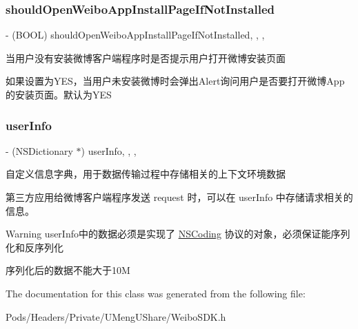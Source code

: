 \subsubsection{\texorpdfstring{should\+Open\+Weibo\+App\+Install\+Page\+If\+Not\+Installed}{shouldOpenWeiboAppInstallPageIfNotInstalled}}
{\footnotesize\ttfamily -\/ (B\+O\+OL) should\+Open\+Weibo\+App\+Install\+Page\+If\+Not\+Installed\hspace{0.3cm}{\ttfamily [read]}, {\ttfamily [write]}, {\ttfamily [nonatomic]}, {\ttfamily [assign]}}

当用户没有安装微博客户端程序时是否提示用户打开微博安装页面

如果设置为\+Y\+E\+S，当用户未安装微博时会弹出\+Alert询问用户是否要打开微博\+App的安装页面。默认为\+Y\+ES \mbox{\label{interface_w_b_data_transfer_object_ab9b7bf91e1470d29782202c04d1a86fe}} 
\subsubsection{\texorpdfstring{user\+Info}{userInfo}}
{\footnotesize\ttfamily -\/ (N\+S\+Dictionary $\ast$) user\+Info\hspace{0.3cm}{\ttfamily [read]}, {\ttfamily [write]}, {\ttfamily [nonatomic]}, {\ttfamily [strong]}}

自定义信息字典，用于数据传输过程中存储相关的上下文环境数据

第三方应用给微博客户端程序发送 request 时，可以在 user\+Info 中存储请求相关的信息。

\begin{DoxyWarning}{Warning}
user\+Info中的数据必须是实现了 {\ttfamily \mbox{\hyperlink{class_n_s_coding-p}{N\+S\+Coding}}} 协议的对象，必须保证能序列化和反序列化 

序列化后的数据不能大于10M 
\end{DoxyWarning}


The documentation for this class was generated from the following file\+:\begin{DoxyCompactItemize}
\item 
Pods/\+Headers/\+Private/\+U\+Meng\+U\+Share/Weibo\+S\+D\+K.\+h\end{DoxyCompactItemize}
